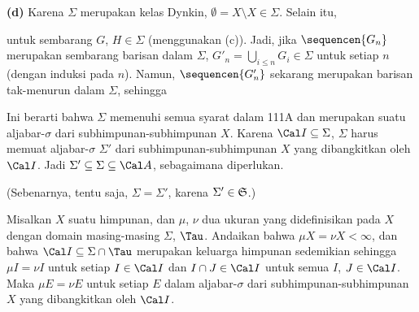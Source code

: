 {\medskip

{\bf (d)} Karena $\Sigma$ merupakan kelas Dynkin,
$\emptyset=X\setminus X\in\Sigma$. Selain itu,


\noindent untuk sembarang $G$, $H\in\Sigma$ (menggunakan (c)).
Jadi, jika $\sequencen{G_n}$ merupakan sembarang barisan dalam $\Sigma$,
$G'_n=\bigcup_{i\le n}G_i\in\Sigma$ untuk setiap $n$ (dengan induksi pada
$n$). Namun, $\sequencen{G'_n}$ sekarang merupakan barisan tak-menurun dalam
$\Sigma$, sehingga


Ini berarti bahwa $\Sigma$ memenuhi semua syarat dalam 111A dan merupakan
suatu aljabar-$\sigma$ dari subhimpunan-subhimpunan $X$. Karena
$\Cal I\subseteq\Sigma$, $\Sigma$ harus memuat aljabar-$\sigma$ $\Sigma'$ dari
subhimpunan-subhimpunan $X$ yang dibangkitkan oleh $\Cal I$. Jadi
$\Sigma'\subseteq\Sigma\subseteq\Cal A$, sebagaimana diperlukan.

(Sebenarnya, tentu saja, $\Sigma=\Sigma'$, karena $\Sigma'\in\frak S$.)
}%


 Misalkan $X$ suatu himpunan, dan $\mu$, $\nu$ dua
ukuran yang didefinisikan pada $X$ dengan domain masing-masing $\Sigma$,
$\Tau$. Andaikan bahwa $\mu X=\nu X<\infty$, dan bahwa
$\Cal I\subseteq\Sigma\cap\Tau$ merupakan keluarga himpunan sedemikian
sehingga $\mu I=\nu I$ untuk setiap $I\in\Cal I$ dan
$I\cap J\in\Cal I$ untuk semua $I$, $J\in\Cal I$. Maka $\mu E=\nu E$ untuk
setiap $E$ dalam aljabar-$\sigma$ dari subhimpunan-subhimpunan $X$ yang
dibangkitkan oleh $\Cal I$.


